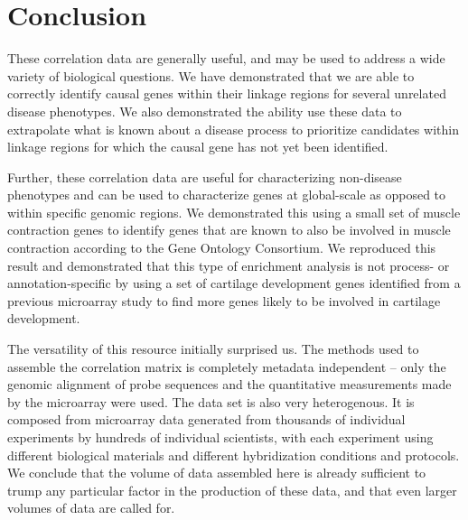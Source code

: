 \documentclass{bioinfo}
\begin{document}
%
%

\section{Conclusion}

These correlation data are generally useful, and may be used to address a wide
variety of biological questions.  We have demonstrated that we are able to
correctly identify causal genes within their linkage regions for several
unrelated disease phenotypes.  We also demonstrated the ability use these data
to extrapolate what is known about a disease process to prioritize candidates
within linkage regions for which the causal gene has not yet been identified.

Further, these correlation data are useful for characterizing non-disease
phenotypes and can be used to characterize genes at global-scale as opposed to
within specific genomic regions.  We demonstrated this using a small set of
muscle contraction genes to identify genes that are known to also be involved
in muscle contraction according to the Gene Ontology Consortium.  We reproduced
this result and demonstrated that this type of enrichment analysis is not
process- or annotation-specific by using a set of cartilage development genes
identified from a previous microarray study to find more genes likely to be
involved in cartilage development.

The versatility of this resource initially surprised us.  The methods used to
assemble the correlation matrix is completely metadata independent -- only the
genomic alignment of probe sequences and the quantitative measurements made by
the microarray were used.  The data set is also very heterogenous.  It is
composed from microarray data generated from thousands of individual
experiments by hundreds of individual scientists, with each experiment using
different biological materials and different hybridization conditions and
protocols.  We conclude that the volume of data assembled here is already
sufficient to trump any particular factor in the production of these data, and
that even larger volumes of data are called for.
\end{document}
